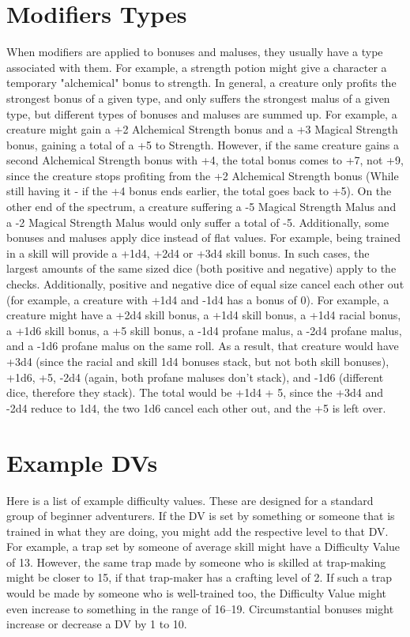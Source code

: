 \section{Modifiers Types}\label{sec:modifierTypes}
When modifiers are applied to bonuses and maluses, they usually have a type associated with them.
For example, a strength potion might give a character a temporary "alchemical" bonus to strength.
In general, a creature only profits the strongest bonus of a given type, and only suffers the strongest malus of a given type, but different types of bonuses and maluses are summed up.
For example, a creature might gain a +2 Alchemical Strength bonus and a +3 Magical Strength bonus, gaining a total of a +5 to Strength.
However, if the same creature gains a second Alchemical Strength bonus with +4, the total bonus comes to +7, not +9, since the creature stops profiting from the +2 Alchemical Strength bonus (While still having it - if the +4 bonus ends earlier, the total goes back to +5).
On the other end of the spectrum, a creature suffering a -5 Magical Strength Malus and a -2 Magical Strength Malus would only suffer a total of -5.
Additionally, some bonuses and maluses apply dice instead of flat values.
For example, being trained in a skill will provide a +1d4, +2d4 or +3d4 skill bonus.
In such cases, the largest amounts of the same sized dice (both positive and negative) apply to the checks.
Additionally, positive and negative dice of equal size cancel each other out (for example, a creature with +1d4 and -1d4 has a bonus of 0).
For example, a creature might have a +2d4 skill bonus, a +1d4 skill bonus, a +1d4 racial bonus, a +1d6 skill bonus, a +5 skill bonus, a -1d4 profane malus, a -2d4 profane malus, and a -1d6 profane malus on the same roll.
As a result, that creature would have +3d4 (since the racial and skill 1d4 bonuses stack, but not both skill bonuses), +1d6, +5, -2d4 (again, both profane maluses don't stack), and -1d6 (different dice, therefore they stack).
The total would be +1d4 + 5, since the +3d4 and -2d4 reduce to 1d4, the two 1d6 cancel each other out, and the +5 is left over.

\section{Example DVs}\label{sec:exampleDVs}
Here is a list of example difficulty values.
These are designed for a standard group of beginner adventurers.
If the DV is set by something or someone that is trained in what they are doing, you might add the respective level to that DV.
For example, a trap set by someone of average skill might have a Difficulty Value of 13.
However, the same trap made by someone who is skilled at trap-making might be closer to 15, if that trap-maker has a crafting level of 2.
If such a trap would be made by someone who is well-trained too, the Difficulty Value might even increase to something in the range of 16--19.
Circumstantial bonuses might increase or decrease a DV by 1 to 10.

